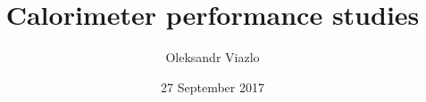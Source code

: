 \documentclass[8pt]{beamer}
\newif\ifplacelogo %
\begin{document}
\newcommand{\myNode}{\tikz[baseline,inner sep=1pt] \node[anchor=base]}



\title[ Calorimeter performance studies \hspace{13.5em}\insertframenumber/
\inserttotalframenumber]{ Calorimeter performance studies }


	\author[Oleksandr Viazlo]{Oleksandr Viazlo \\ 
	}
	
       
	\date{27 September 2017}


	

   	

\placelogofalse
\end{document}
